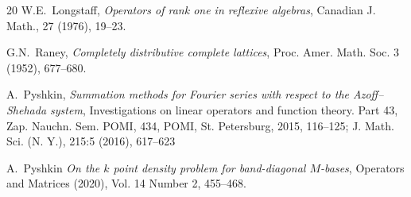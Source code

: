\begin {thebibliography}{20}
    W.E.~\!Longstaff,
    \emph{Operators of rank one in reflexive algebras},
    Canadian J. Math., 27 (1976), 19--23.

    G.N.~\!Raney,
    \emph{Completely distributive complete lattices},
    Proc. Amer. Math. Soc. 3 (1952), 677--680.

    A.~\!Pyshkin,
    \emph{Summation methods for Fourier series with respect to the Azoff–Shehada system},
    Investigations on linear operators and function theory. Part 43, Zap. Nauchn. Sem. POMI, 434, POMI, St. Petersburg, 2015, 116--125; J. Math. Sci. (N. Y.), 215:5 (2016), 617--623

    A.~\!Pyshkin
    \emph{On the $k$ point density problem for band-diagonal $M$-bases},
    Operators and Matrices (2020), Vol. 14 Number 2, 455--468.


\end{thebibliography}
